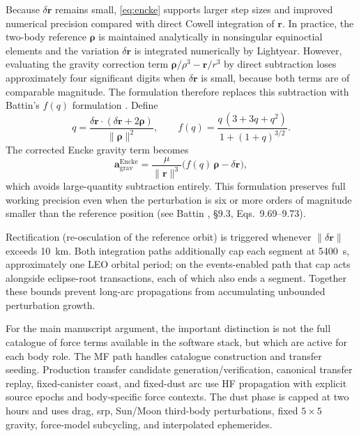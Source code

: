         Because \(\delta\boldsymbol{r}\) remains small, \cref{eq:encke} supports larger step sizes and improved numerical precision compared with direct Cowell integration of \(\boldsymbol{r}\). In practice, the two-body reference \(\boldsymbol{\rho}\) is maintained analytically in nonsingular equinoctial elements and the variation \(\delta\boldsymbol{r}\) is integrated numerically by Lightyear. However, evaluating the gravity correction term \(\boldsymbol{\rho}/\rho^3 - \boldsymbol{r}/r^3\) by direct subtraction loses approximately four significant digits when \(\delta\boldsymbol{r}\) is small, because both terms are of comparable magnitude. The formulation therefore replaces this subtraction with Battin's \(f(q)\) formulation \cite{battin1999}. Define
        \begin{equation}
            q = \frac{\delta\boldsymbol{r}\cdot(\delta\boldsymbol{r}+2\boldsymbol{\rho})}{\|\boldsymbol{\rho}\|^2},
            \qquad
            f(q) = \frac{q\,(3+3q+q^2)}{1+(1+q)^{3/2}}.
            \label{eq:battin_fq}
        \end{equation}
        The corrected Encke gravity term becomes
        \begin{equation}
            \boldsymbol{a}_{\mathrm{grav}}^{\mathrm{Encke}}
            = \frac{\mu}{\|\boldsymbol{r}\|^3}\bigl(f(q)\,\boldsymbol{\rho}-\delta\boldsymbol{r}\bigr),
            \label{eq:battin_encke_correction}
        \end{equation}
        which avoids large-quantity subtraction entirely. This formulation preserves full working precision even when the perturbation is six or more orders of magnitude smaller than the reference position (see Battin \cite{battin1999}, \S9.3, Eqs.~9.69--9.73).

        Rectification (re-osculation of the reference orbit) is triggered whenever \(\|\delta\boldsymbol{r}\|\) exceeds \SI{10}{\kilo\metre}. Both integration paths additionally cap each segment at \SI{5400}{\second}, approximately one LEO orbital period; on the events-enabled path that cap acts alongside eclipse-root transactions, each of which also ends a segment. Together these bounds prevent long-arc propagations from accumulating unbounded perturbation growth.

        For the main manuscript argument, the important distinction is not the full catalogue of force terms available in the software stack, but which are active for each body role. The MF path handles catalogue construction and transfer seeding. Production transfer candidate generation/verification, canonical transfer replay, fixed-canister coast, and fixed-dust arc use HF propagation with explicit source epochs and body-specific force contexts. The dust phase is capped at two hours and uses drag, \gls{srp}, Sun/Moon third-body perturbations, fixed \(5\times5\) gravity, force-model subcycling, and interpolated ephemerides.

